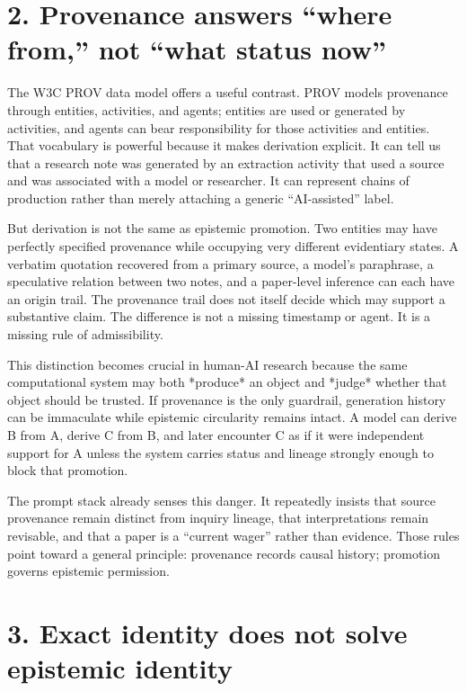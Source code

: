\documentclass[11pt]{article}
\begin{document}
\section*{2. Provenance answers “where from,” not “what status now”}



The W3C PROV data model offers a useful contrast. PROV models provenance through entities, activities, and agents; entities are used or generated by activities, and agents can bear responsibility for those activities and entities. That vocabulary is powerful because it makes derivation explicit. It can tell us that a research note was generated by an extraction activity that used a source and was associated with a model or researcher. It can represent chains of production rather than merely attaching a generic “AI-assisted” label.



But derivation is not the same as epistemic promotion. Two entities may have perfectly specified provenance while occupying very different evidentiary states. A verbatim quotation recovered from a primary source, a model’s paraphrase, a speculative relation between two notes, and a paper-level inference can each have an origin trail. The provenance trail does not itself decide which may support a substantive claim. The difference is not a missing timestamp or agent. It is a missing rule of admissibility.



This distinction becomes crucial in human-AI research because the same computational system may both *produce* an object and *judge* whether that object should be trusted. If provenance is the only guardrail, generation history can be immaculate while epistemic circularity remains intact. A model can derive B from A, derive C from B, and later encounter C as if it were independent support for A unless the system carries status and lineage strongly enough to block that promotion.



The prompt stack already senses this danger. It repeatedly insists that source provenance remain distinct from inquiry lineage, that interpretations remain revisable, and that a paper is a “current wager” rather than evidence. Those rules point toward a general principle: provenance records causal history; promotion governs epistemic permission.



\section*{3. Exact identity does not solve epistemic identity}
\end{document}
